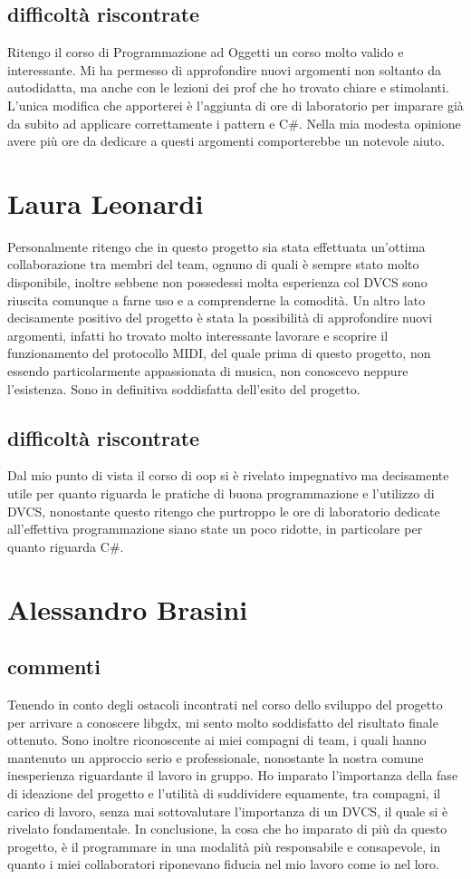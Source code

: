 \documentclass[a4paper,12pt]{report}
\begin{document}
\subsection{difficoltà riscontrate}
Ritengo il corso di Programmazione ad Oggetti un corso molto valido e interessante. 
Mi ha permesso di approfondire nuovi argomenti non soltanto da autodidatta, ma anche con le lezioni dei prof 
che ho trovato chiare e stimolanti. L'unica modifica che apporterei è l'aggiunta di ore di laboratorio per
imparare già da subito ad applicare correttamente i pattern e C\#. Nella mia modesta opinione avere più ore da dedicare a questi argomenti
comporterebbe un notevole aiuto.
\newpage
\section{Laura Leonardi}
Personalmente ritengo che in questo progetto sia stata effettuata un'ottima collaborazione tra membri del team, ognuno di quali è sempre stato molto disponibile, inoltre sebbene non possedessi molta esperienza col DVCS sono riuscita comunque a farne uso e a comprenderne la comodità. Un altro lato decisamente positivo del progetto è stata la possibilità di approfondire nuovi argomenti, infatti ho trovato molto interessante lavorare e scoprire il funzionamento del protocollo MIDI, del quale prima di questo progetto, non essendo particolarmente appassionata di musica, non conoscevo neppure l'esistenza. Sono in definitiva soddisfatta dell'esito del progetto.
\subsection{difficoltà riscontrate}
Dal mio punto di vista il corso di oop si è rivelato impegnativo ma decisamente utile per quanto riguarda le pratiche di buona programmazione e l'utilizzo di DVCS, nonostante questo ritengo che purtroppo le ore di laboratorio dedicate all'effettiva programmazione siano state un poco ridotte, in particolare per quanto riguarda C\#.
\newpage

\section{Alessandro Brasini}
\subsection{commenti}
Tenendo in conto degli ostacoli incontrati nel corso dello sviluppo del progetto per arrivare a conoscere libgdx, mi sento molto soddisfatto del risultato finale ottenuto.
Sono inoltre riconoscente ai miei compagni di team, i quali hanno mantenuto un approccio serio e professionale, nonostante la nostra comune inesperienza riguardante il lavoro in gruppo.
Ho imparato l'importanza della fase di ideazione del progetto e l'utilità di suddividere equamente, tra compagni, il carico di lavoro, senza mai sottovalutare l'importanza di un DVCS, il quale si è rivelato fondamentale.
In conclusione, la cosa che ho imparato di più da questo progetto, è il programmare in una modalità più responsabile e consapevole, in quanto i miei collaboratori riponevano fiducia nel mio lavoro come io nel loro.
\end{document}
